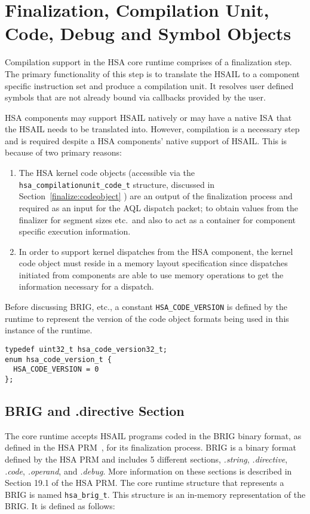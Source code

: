 \hypertarget{finalizer}{}\section{Finalization, Compilation Unit,
Code, Debug and Symbol Objects}\label{finalizer}

Compilation support in the HSA core runtime comprises of a
finalization step. The primary functionality of this step is to
translate the HSAIL to a component specific instruction set and
produce a compilation unit. It resolves user defined symbols that
are not already bound via callbacks provided by the user.

HSA components may support HSAIL natively or may have a native ISA
that the HSAIL needs to be translated into. However, compilation is a
necessary step and is required despite a HSA components' native support
of HSAIL. This is because of two primary reasons:

\begin{enumerate}
\item  The HSA kernel code objects (accessible via the
\texttt{hsa\_compilationunit\_code\_t} structure, discussed in
Section~\ref{finalize:codeobject} ) are an output of the
finalization process and required as an input for the AQL dispatch
packet; to obtain values from the finalizer for segment sizes etc.\
and also to act as a container for component specific execution
information.

\item In order to support kernel dispatches from the HSA
component, the kernel code object must reside in a memory layout
specification since dispatches initiated from components are able
to use memory operations to get the information necessary for a
dispatch.
\end{enumerate}

Before discussing BRIG, etc., a constant \texttt{HSA\_CODE\_VERSION}
is defined by the runtime to represent the version of the code
object formats being used in this instance of the runtime.

\begin{lstlisting}
typedef uint32_t hsa_code_version32_t;
enum hsa_code_version_t {
  HSA_CODE_VERSION = 0
};
\end{lstlisting}

\subsection{BRIG and .directive Section}
The core runtime accepts H\-S\-A\-I\-L programs coded in the
B\-R\-I\-G binary format, as defined in the HSA PRM~\cite{prm}, for its
finalization process. BRIG is a binary format defined by the HSA
PRM and includes 5 different sections, \emph{.string},
\emph{.directive}, \emph{.code}, \emph{.operand}, and \emph{.debug}.
More information on these sections is described in Section 19.1 of
the HSA PRM. The core runtime structure that represents a
BRIG is named \texttt{hsa\_brig\_t}. This structure is an in-memory
representation of the BRIG. It is defined as follows:

